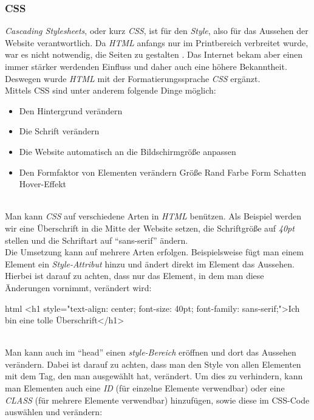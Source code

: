 		\subsubsection{CSS}
		\label{chapter:study-frontend-css}
		\textit{Cascading Stylesheets}, oder kurz \textit{CSS}, ist für den \textit{Style}, also für das Aussehen der Website verantwortlich. Da \textit{HTML} anfangs nur im Printbereich verbreitet wurde, war es nicht notwendig, die Seiten zu gestalten \cite{html5-css3-def, html5-css3-handbuch}. Das Internet bekam aber einen immer stärker werdenden Einfluss und daher auch eine höhere Bekanntheit. Deswegen wurde \textit{HTML} mit der Formatierungssprache \textit{CSS} ergänzt.\\
		Mittels CSS sind unter anderem folgende Dinge möglich:
		\begin{itemize}
			\item Den Hintergrund verändern
			\item Die Schrift verändern
			\item Die Website automatisch an die Bildschirmgröße anpassen
			\item Den Formfaktor von Elementen verändern
			\subitem Größe
			\subitem Rand
			\subitem Farbe
			\subitem Form
			\subitem Schatten
			\subitem Hover-Effekt
		\end{itemize}
	\label{list:bspcss}~\\
		Man kann \textit{CSS} auf verschiedene Arten in \textit{HTML} benützen. Als Beispiel werden wir eine Überschrift in die Mitte der Website setzen, die Schriftgröße auf \textit{40pt} stellen und die Schriftart auf \enquote{sans-serif} ändern.\\
		Die Umsetzung kann auf mehrere Arten erfolgen. Beispielsweise fügt man einem Element ein \textit{Style-Attribut} hinzu und ändert direkt im Element das Aussehen. Hierbei ist darauf zu achten, dass nur das Element, in dem man diese Änderungen vornimmt, verändert wird:
		\begin{code}{html}
			<h1 style="text-align: center; font-size: 40pt; font-family: sans-serif;">Ich bin eine tolle Überschrift</h1>
		\end{code}
	\label{list:bspinlinecss}~\\
		Man kann auch im \enquote{head} einen \textit{style-Bereich} eröffnen und dort das Aussehen verändern. Dabei ist darauf zu achten, dass man den Style von allen Elementen mit dem Tag, den man ausgewählt hat, verändert. Um dies zu verhindern, kann man Elementen auch eine \textit{ID} (für einzelne Elemente verwendbar) oder eine \textit{CLASS} (für mehrere Elemente verwendbar) hinzufügen, sowie diese im CSS-Code auswählen und verändern:
